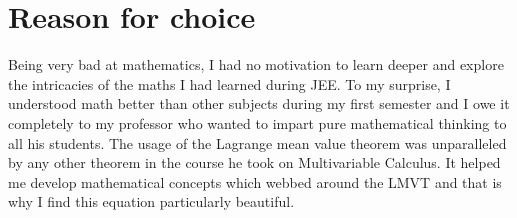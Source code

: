 \documentclass[12pt]{article}
\begin{document}
\section*{Reason for choice}
Being very bad at mathematics, I had no motivation to learn deeper and explore the intricacies of the maths I had learned during JEE. To my surprise, I understood math better than other subjects during my first semester and I owe it completely to my professor who wanted to impart pure mathematical thinking to all his students. The usage of the Lagrange mean value theorem was unparalleled by any other theorem in the course he took on Multivariable Calculus. It helped me develop mathematical concepts which webbed around the LMVT and that is why I find this equation particularly beautiful.


\end{document}
